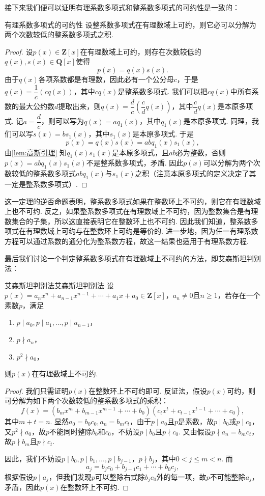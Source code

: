 接下来我们便可以证明有理系数多项式和整系数多项式的可约性是一致的：
\begin{theorem}{}{有理系数多项式的可约性}
    设整系数多项式在有理数域上可约，则它必可以分解为两个次数较低的整系数多项式之积.
\end{theorem}
\begin{proof}
    设$p(x)\in\mathbf{Z}[x]$在有理数域上可约，则存在次数较低的$q(x),s(x)\in\mathbf{Q}[x]$使得
    \[p(x)=q(x)s(x).\]
    由于$q(x)$各项系数都是有理数，因此必有一个公分母$c$，于是$q(x)=\dfrac{1}{c}(cq(x))$，其中$cq(x)$是整系数多项式. 我们可以把$cq(x)$中所有系数的最大公约数$d$提取出来，则$q(x)=\dfrac{d}{c}(\dfrac{c}{d}q(x))$，其中$\dfrac{c}{d}q(x)$是本原多项式. 记$a=\dfrac{d}{c}$，则可以写为$q(x)=aq_1(x)$，其中$q_1(x)$是本原多项式. 同理，我们可以写$s(x)=bs_1(x)$，其中$s_1(x)$是本原多项式. 于是
    \[p(x)=q(x)s(x)=abq_1(x)s_1(x),\]
    由\autoref{lem:高斯引理} 知$q_1(x)s_1(x)$是本原多项式，且$ab$必为整数，否则$p(x)=abq_1(x)s_1(x)$不是整系数多项式，矛盾. 因此$p(x)$可以分解为两个次数较低的整系数多项式$abq_1(x)$与$s_1(x)$之积（注意本原多项式的定义决定了其一定是整系数多项式）.
\end{proof}

这一定理的逆否命题表明，整系数多项式如果在整数环上不可约，则它在有理数域上也不可约. 反之，如果整系数多项式在有理数域上不可约，因为整数集合是有理数集合的子集，所以这直接表明它在整数环上也不可约. 因此我们知道，整系数多项式在有理数域上可约与在整数环上可约是等价的. 进一步地，因为任一有理系数方程可以通过系数的通分化为整系数方程，故这一结果也适用于有理系数方程.

最后我们讨论一个判定整系数多项式在有理数域上不可约的方法，即艾森斯坦判别法：
\begin{theorem}{艾森斯坦判别法}{艾森斯坦判别法}
    设$p(x)=a_nx^n+a_{n-1}x^{n-1}+\cdots+a_1x+a_0\in\mathbf{Z}[x]$，$a_n\neq 0$且$n\geqslant 1$，若存在一个素数$p$，满足
    \begin{enumerate}
        \item $p\mid a_0,p\mid a_1,\ldots,p\mid a_{n-1}$，
        \item $p\nmid a_n$，
        \item $p^2\nmid a_0$，
    \end{enumerate}
    则$p(x)$在有理数域上不可约.
\end{theorem}
\begin{proof}
    我们只需证明$p(x)$在整数环上不可约即可. 反证法，假设$p(x)$可约，则可分解为如下两个次数较低的整系数多项式的乘积：
    \[f(x)=(b_mx^m+b_{m-1}x^{m-1}+\cdots+b_0)(c_tx^t+c_{t-1}x^{t-1}+\cdots+c_0),\]
    其中$m+t=n$. 显然$a_0=b_0c_0,a_n=b_mc_t$，由于$p\mid a_0$且$p$是素数，故$p\mid b_0$或$p\mid c_0$，又$p^2\nmid a_0$，故$p$不能同时整除$b_0$和$c_0$，不妨设$p\mid b_0$且$p\nmid c_0$. 又由假设$p\nmid a_n=b_mc_t$，故$p\nmid b_m$且$p\nmid c_t$.

    因此，我们不妨设$p\mid b_0,p\mid b_1,\ldots,p\mid b_{j-1}$，$p\nmid b_j$，其中$0<j\leqslant m<n$. 而
    \[a_j=b_jc_0+b_{j-1}c_1+\cdots+b_0c_j,\]
    根据假设$p\mid a_j$，但我们发现$p$可以整除右式除$b_jc_0$外的每一项，故$p$不可能整除$a_j$，矛盾，因此$p(x)$在整数环上不可约.
\end{proof}


